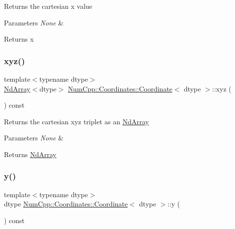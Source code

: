 Returns the cartesian x value


\begin{DoxyParams}{Parameters}
{\em None} & \\
\hline
\end{DoxyParams}
\begin{DoxyReturn}{Returns}
x 
\end{DoxyReturn}
\mbox{\label{class_num_cpp_1_1_coordinates_1_1_coordinate_a17960f2fcadf941cbfaa8c38aa26c07d}} 
\subsubsection{\texorpdfstring{xyz()}{xyz()}}
{\footnotesize\ttfamily template$<$typename dtype$>$ \\
\mbox{\hyperlink{class_num_cpp_1_1_nd_array}{Nd\+Array}}$<$dtype$>$ \mbox{\hyperlink{class_num_cpp_1_1_coordinates_1_1_coordinate}{Num\+Cpp\+::\+Coordinates\+::\+Coordinate}}$<$ dtype $>$\+::xyz (\begin{DoxyParamCaption}{ }\end{DoxyParamCaption}) const\hspace{0.3cm}{\ttfamily [inline]}}

Returns the cartesian xyz triplet as an \mbox{\hyperlink{class_num_cpp_1_1_nd_array}{Nd\+Array}}


\begin{DoxyParams}{Parameters}
{\em None} & \\
\hline
\end{DoxyParams}
\begin{DoxyReturn}{Returns}
\mbox{\hyperlink{class_num_cpp_1_1_nd_array}{Nd\+Array}} 
\end{DoxyReturn}
\mbox{\label{class_num_cpp_1_1_coordinates_1_1_coordinate_a913147d914b6435aee56a266e0148cbe}} 
\subsubsection{\texorpdfstring{y()}{y()}}
{\footnotesize\ttfamily template$<$typename dtype$>$ \\
dtype \mbox{\hyperlink{class_num_cpp_1_1_coordinates_1_1_coordinate}{Num\+Cpp\+::\+Coordinates\+::\+Coordinate}}$<$ dtype $>$\+::y (\begin{DoxyParamCaption}{ }\end{DoxyParamCaption}) const\hspace{0.3cm}{\ttfamily [inline]}}

